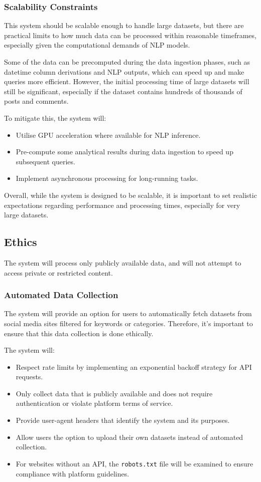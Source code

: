 \documentclass[12pt, a4paper]{article}
\begin{document}
\subsubsection{Scalability Constraints}
This system should be scalable enough to handle large datasets, but there are practical limits to how much data can be processed within reasonable timeframes, especially given the computational demands of NLP models.

Some of the data can be precomputed during the data ingestion phases, such as datetime column derivations and NLP outputs, which can speed up and make queries more efficient. However, the initial processing time of large datasets will still be significant, especially if the dataset contains hundreds of thousands of posts and comments.

To mitigate this, the system will:
\begin{itemize}
    \item Utilise GPU acceleration where available for NLP inference.
    \item Pre-compute some analytical results during data ingestion to speed up subsequent queries.
    \item Implement asynchronous processing for long-running tasks.
\end{itemize}

Overall, while the system is designed to be scalable, it is important to set realistic expectations regarding performance and processing times, especially for very large datasets.

\subsection{Ethics}
The system will process only publicly available data, and will not attempt to access private or restricted content.

\subsubsection{Automated Data Collection}
The system will provide an option for users to automatically fetch datasets from social media sites filtered for keywords or categories. Therefore, it's important to ensure that this data collection is done ethically.

The system will:
\begin{itemize}
    \item Respect rate limits by implementing an exponential backoff strategy for API requests.
    \item Only collect data that is publicly available and does not require authentication or violate platform terms of service.
    \item Provide user-agent headers that identify the system and its purposes.
    \item Allow users the option to upload their own datasets instead of automated collection.
    \item For websites without an API, the \texttt{robots.txt} file will be examined to ensure compliance with platform guidelines.
\end{itemize}
\end{document}
